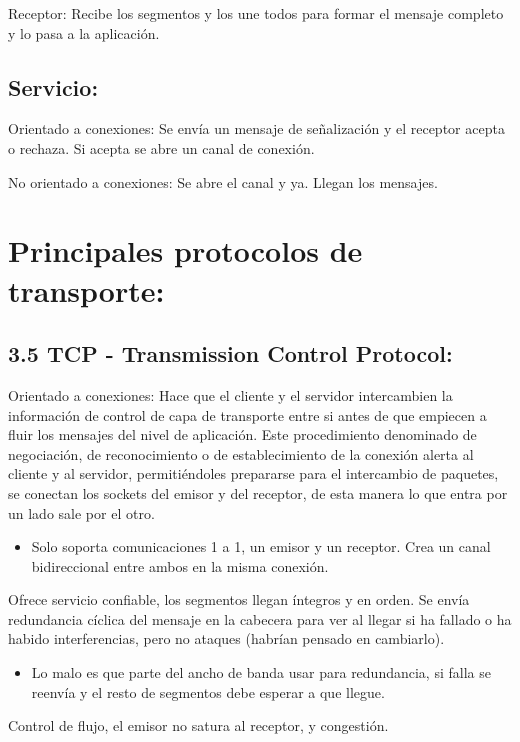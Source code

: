\documentclass[12pt, twoside, openright]{report} %
\begin{document}
Receptor: Recibe los segmentos y los une todos para formar el
mensaje completo y lo pasa a la aplicación.


\subsection{Servicio:}


Orientado a conexiones: Se envía un mensaje de señalización y el
receptor acepta o rechaza. Si acepta se abre un canal de conexión.

No orientado a conexiones: Se abre el canal y ya. Llegan los
mensajes.


\section{Principales protocolos de transporte:}
\subsection{3.5 TCP - Transmission Control Protocol:}


Orientado a conexiones: Hace que el cliente y el servidor
intercambien la información de control de capa de transporte entre
si antes de que empiecen a fluir los mensajes del nivel de
aplicación. Este procedimiento denominado de negociación, de
reconocimiento o de establecimiento de la conexión alerta al cliente
y al servidor, permitiéndoles prepararse para el intercambio de
paquetes, se conectan los sockets del emisor y del receptor, de esta
manera lo que entra por un lado sale por el otro.

\begin{itemize}
	\item Solo soporta comunicaciones 1 a 1, un emisor y un receptor. Crea
	      un canal bidireccional entre ambos en la misma conexión.
\end{itemize}
\pagebreak
Ofrece servicio confiable, los segmentos llegan íntegros y en orden.
Se envía redundancia cíclica del mensaje en la cabecera para ver al
llegar si ha fallado o ha habido interferencias, pero no ataques
(habrían pensado en cambiarlo).

\begin{itemize}
	\item Lo malo es que parte del ancho de banda usar para redundancia,
	      si falla se reenvía y el resto de segmentos debe esperar a que
	      llegue.
\end{itemize}

Control de flujo, el emisor no satura al receptor, y congestión.
\end{document}
